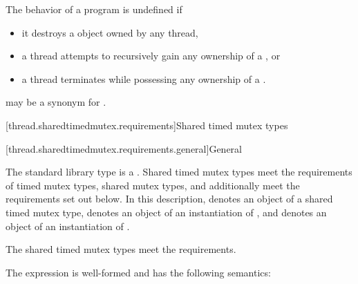 \pnum
The behavior of a program is undefined if
\begin{itemize}
\item it destroys a  object owned by any thread,
\item a thread attempts to recursively gain any ownership of a , or
\item a thread terminates while possessing any ownership of a .
\end{itemize}

\pnum
{} may be a synonym for .

[thread.sharedtimedmutex.requirements]{Shared timed mutex types}

[thread.sharedtimedmutex.requirements.general]{General}

\pnum
The standard library type  is a
. Shared timed mutex types meet the requirements of
timed mutex types,
shared mutex types, and additionally
meet the requirements set out below. In this description,
 denotes an object of a shared timed mutex type,
 denotes an object of an instantiation of
, and
 denotes an object of an instantiation of
.
\begin{note}
The shared timed mutex types meet the 
requirements.
\end{note}

\pnum
The expression  is well-formed and
has the following semantics:

